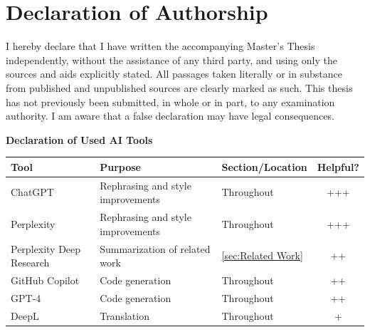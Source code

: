 \documentclass{DESSThesis}
\begin{document}
\sloppy
\makeatletter
\let\RealToC\tableofcontents
\let\RealLoF\listoffigures
\let\RealLoT\listoftables
\renewcommand{\tableofcontents}{}
\renewcommand{\listoffigures}{}
\renewcommand{\listoftables}{}
\makeatother



\clearpage
\thispagestyle{empty}\null
\newpage

\makeatletter
\let\tableofcontents\RealToC
\let\listoffigures\RealLoF
\let\listoftables\RealLoT
\makeatother

\setcounter{page}{1}

\chapter*{Declaration of Authorship}
I hereby declare that I have written the accompanying Master’s Thesis independently, without the assistance of any third party, and using only the sources and aids explicitly stated. All passages taken literally or in substance from published and unpublished sources are clearly marked as such. This thesis has not previously been submitted, in whole or in part, to any examination authority. I am aware that a false declaration may have legal consequences.

\begin{center}
  \textbf{Declaration of Used AI Tools} \\[.3em]
  \begin{tabularx}{\textwidth}{lXlc}
    \toprule
    Tool & Purpose & Section/Location & Helpful? \\
    \midrule
    ChatGPT & Rephrasing and style improvements & Throughout & +++ \\
    Perplexity & Rephrasing and style improvements & Throughout & +++ \\
    Perplexity Deep Research & Summarization of related work & \autoref{sec:Related Work}& ++ \\
    GitHub Copilot & Code generation & Throughout & ++ \\
    GPT-4 & Code generation & Throughout & ++ \\
    DeepL & Translation & Throughout & + \\
    \bottomrule
  \end{tabularx}
\end{center}
\end{document}
